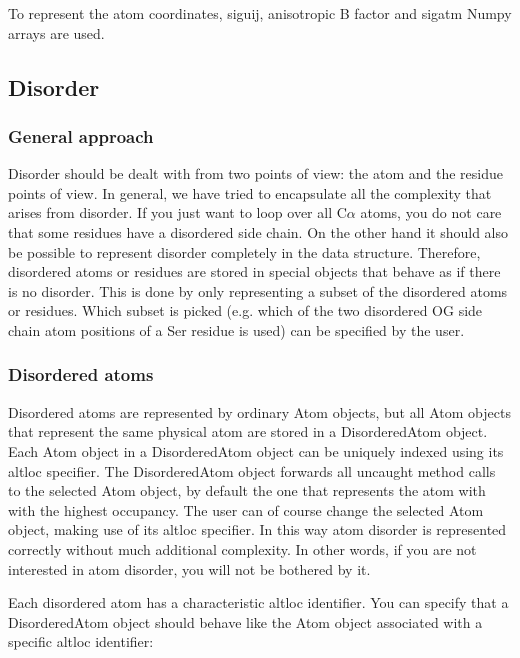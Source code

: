 \documentclass{report}
\begin{document}
To represent the atom coordinates, siguij, anisotropic B factor and sigatm Numpy
arrays are used.


\subsection{Disorder}


\subsubsection{General approach\label{disorder problems}}

Disorder should be dealt with from two points of view: the atom and the residue
points of view. In general, we have tried to encapsulate all the complexity that
arises from disorder. If you just want to loop over all C\( \alpha  \) atoms,
you do not care that some residues have a disordered side chain. On the other
hand it should also be possible to represent disorder completely in the data
structure. Therefore, disordered atoms or residues are stored in special objects
that behave as if there is no disorder. This is done by only representing a
subset of the disordered atoms or residues. Which subset is picked (e.g. which
of the two disordered OG side chain atom positions of a Ser residue is used)
can be specified by the user.


\subsubsection{Disordered atoms\label{disordered atoms}}

Disordered atoms are represented by ordinary Atom objects, but all Atom objects
that represent the same physical atom are stored in a DisorderedAtom object.
Each Atom object in a DisorderedAtom object can be uniquely indexed using its
altloc specifier. The DisorderedAtom object forwards all uncaught method calls
to the selected Atom object, by default the one that represents the atom with
with the highest occupancy. The user can of course change the selected Atom
object, making use of its altloc specifier. In this way atom disorder is represented
correctly without much additional complexity. In other words, if you are not
interested in atom disorder, you will not be bothered by it.

Each disordered atom has a characteristic altloc identifier. You can specify
that a DisorderedAtom object should behave like the Atom object associated with
a specific altloc identifier:
\end{document}
